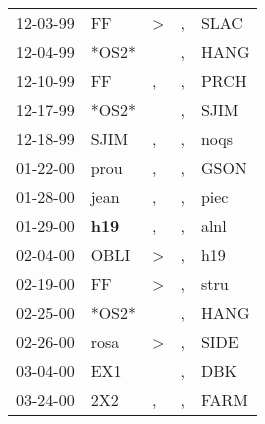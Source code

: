 \begin{supertabular}{p{0.07\textwidth}p{0.06\textwidth}p{0.02\textwidth}p{0.02\textwidth}p{0.06\textwidth}}
          12-03-99\textsuperscript{} &             FF\textsuperscript{} &     \textgreater &                , &           SLAC\textsuperscript{} \\
          12-04-99\textsuperscript{} &                            *OS2* &                  &                , &           HANG\textsuperscript{} \\
          12-10-99\textsuperscript{} &             FF\textsuperscript{} &                , &                , &           PRCH\textsuperscript{} \\
          12-17-99\textsuperscript{} &                            *OS2* &                  &                , &           SJIM\textsuperscript{} \\
          12-18-99\textsuperscript{} &           SJIM\textsuperscript{} &                , &                , &           noqs\textsuperscript{} \\
          01-22-00\textsuperscript{} &           prou\textsuperscript{} &                , &                , &           GSON\textsuperscript{} \\
          01-28-00\textsuperscript{} &           jean\textsuperscript{} &                , &                , &           piec\textsuperscript{} \\
          01-29-00\textsuperscript{} &   \textbf{h19\textsuperscript{}} &                , &                , &           alnl\textsuperscript{} \\
          02-04-00\textsuperscript{} &           OBLI\textsuperscript{} &     \textgreater &                , &            h19\textsuperscript{} \\
          02-19-00\textsuperscript{} &             FF\textsuperscript{} &     \textgreater &                , &           stru\textsuperscript{} \\
          02-25-00\textsuperscript{} &                            *OS2* &                  &                , &           HANG\textsuperscript{} \\
          02-26-00\textsuperscript{} &           rosa\textsuperscript{} &     \textgreater &                , &           SIDE\textsuperscript{} \\
          03-04-00\textsuperscript{} &            EX1\textsuperscript{} &                  &                , &            DBK\textsuperscript{} \\
          03-24-00\textsuperscript{} &            2X2\textsuperscript{} &                , &                , &           FARM\textsuperscript{} \\

\end{supertabular}
